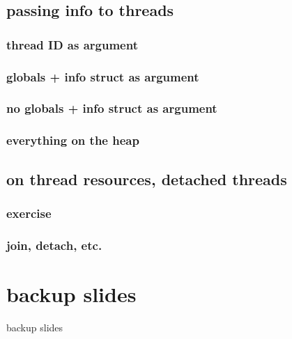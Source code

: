\subsection{passing info to threads}

\subsubsection{thread ID as argument}


\subsubsection{globals + info struct as argument}



\subsubsection{no globals + info struct as argument}



\subsubsection{everything on the heap}



\subsection{on thread resources, detached threads}

\subsubsection{exercise}


\subsubsection{join, detach, etc.}






\section{backup slides}
\begin{frame}{backup slides}
\end{frame}


